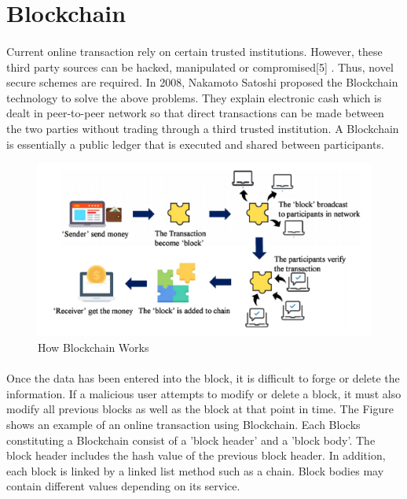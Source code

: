 \section{Blockchain}
\paragraph{}Current online transaction rely on certain trusted
institutions. However, these third party sources can be hacked,
manipulated or compromised[5] . Thus, novel secure schemes
are required.
In 2008, Nakamoto Satoshi proposed the Blockchain
technology to solve the above problems. They explain
electronic cash which is dealt in peer-to-peer network so that
direct transactions can be made between the two parties
without trading through a third trusted institution. A
Blockchain is essentially a public ledger that is executed and
shared between participants.

\begin{figure}[H]
	\centering
	\includegraphics[scale=0.3]{working_blockchain.png}
	\caption{How Blockchain Works}
\end{figure}

\paragraph{}
 Once the data has been entered
into the block, it is difficult to forge or delete the information.
If a malicious user attempts to modify or delete a block, it must
also modify all previous blocks as well as the block at that
point in time. The Figure shows an example of an online
transaction using Blockchain. Each Blocks constituting a Blockchain consist of a 'block
header' and a 'block body'. The block header includes the hash
value of the previous block header. In addition, each block is
linked by a linked list method such as a chain. Block bodies
may contain different values depending on its service.
